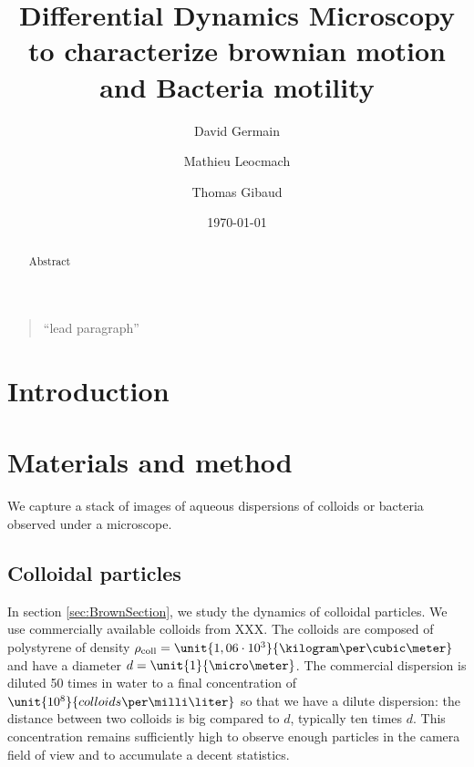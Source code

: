 \documentclass[%
 aip,
 jmp,%
 amsmath,amssymb,
reprint,%
]{revtex4-1}
\begin{document}

\title[Sample title]{Differential Dynamics Microscopy to characterize brownian motion and Bacteria motility}%

\author{David Germain}
\author{Mathieu Leocmach}
\author{Thomas Gibaud}

\date{\today}%

\begin{abstract}
Abstract
\end{abstract}

\maketitle

\begin{quotation}
``lead paragraph''
\end{quotation}

\section{\label{sec:level1}Introduction}



\section{Materials and method}

We capture a stack of images of aqueous dispersions of colloids or bacteria observed under a microscope.

\subsection{Colloidal particles}

In section \ref{sec:BrownSection}, we study the dynamics of colloidal particles. We use commercially available colloids from XXX. The colloids are composed of polystyrene of density $\rho_\text{coll} = \unit{1,06\cdot10^3}{\kilogram\per\cubic\meter}$ and have a diameter $d = \unit{1}{\micro\meter}$. The commercial dispersion is diluted 50 times in water to a final concentration of $\unit{10^8}{colloids\per\milli\liter}$ so that we have a dilute dispersion: the distance between two colloids is big compared to $d$, typically ten times $d$. This concentration remains sufficiently high to observe enough particles in the camera field of view and to accumulate a decent statistics.
\end{document}
